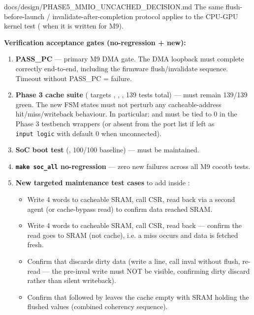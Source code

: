 \begin{relocated}{docs/design/PHASE5_MMIO_UNCACHED_DECISION.md}
The same flush-before-launch / invalidate-after-completion protocol
applies to the CPU-GPU kernel test (
when it is written for M9).

\textbf{Verification acceptance gates (no-regression + new):}

\begin{enumerate}
\def\labelenumi{\arabic{enumi}.}
\item
  \textbf{ PASS\_PC} --- primary M9 DMA
  gate. The DMA loopback must complete correctly end-to-end, including
  the firmware flush/\allowbreak{}invalidate sequence. Timeout without
  PASS\_PC = failure.
\item
  \textbf{Phase 3 cache suite} ( targets
  , , , 139
  tests total) --- must remain 139/139 green. The new FSM states must
  not perturb any cacheable-address
  hit/\allowbreak{}miss/\allowbreak{}writeback behaviour. In particular:
   and  must be tied to 0 in the Phase
  3 testbench wrappers (or absent from the port list if left as
  \texttt{input\ logic} with default 0 when unconnected).
\item
  \textbf{SoC boot test} (, 100/100 baseline) ---
  must be maintained.
\item
  \textbf{\texttt{make\ soc\_\allowbreak{}all} no-regression} --- zero
  new failures across all M9 cocotb tests.
\item
  \textbf{New targeted maintenance test cases} to add inside
  :

  \begin{itemize}
  \tightlist
  \item
    Write 4 words to cacheable SRAM, call  CSR, read
    back via a second agent (or cache-bypass read) to confirm data
    reached SRAM.
  \item
    Write 4 words to cacheable SRAM, call  CSR, read
    back --- confirm the read goes to SRAM (not cache), i.e. a miss
    occurs and data is fetched fresh.
  \item
    Confirm that  discards dirty data (write a line,
    call inval without flush, re-read --- the pre-inval write must NOT
    be visible, confirming dirty discard rather than silent writeback).
  \item
    Confirm that  followed by 
    leaves the cache empty with SRAM holding the flushed values
    (combined coherency sequence).
  \end{itemize}
\end{enumerate}


\end{relocated}
